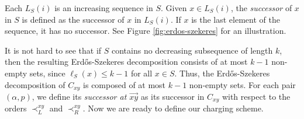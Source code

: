 \documentclass[11pt]{amsart}
\theoremstyle{definition}
\begin{document}
\noindent
\begin{minipage}[t]{0.59\textwidth}
\vspace{0pt}
Each $L_S(i)$ is an increasing sequence in $S$. Given $x\in L_S(i)$, the \emph{successor} of $x$ in $S$ is defined as the successor of $x$ in $L_S(i)$. If $x$ is the last element of the sequence, it has no successor. See Figure \ref{fig:erdos-szekeres} for an illustration.

\smallskip

It is not hard to see that if $S$ contains no decreasing subsequence of length $k$, then the resulting Erd\H{o}s-Szekeres decomposition consists of at most $k-1$ non-empty sets, since $\ell_S(x)\leq k-1$ for all $x\in S$.
Thus, the Erd\H{o}s-Szekeres decomposition of $C_{xy}$ is composed of at most $k-1$ non-empty sets.
For each pair $(\alpha, p)$, we  define its \textit{successor at $\vec{xy}$} as its successor in $C_{xy}$ with respect to the orders $\prec_L^{xy}$ and $\prec_R^{xy}$. Now we are ready to define our charging scheme.

\end{minipage}\hfill
\begin{minipage}[t]{0.37\textwidth}
\vspace{0pt}\centering
\setlength{\captionindent}{0pt}
\label{fig:erdos-szekeres}
\end{minipage}\par\medskip
\end{document}
